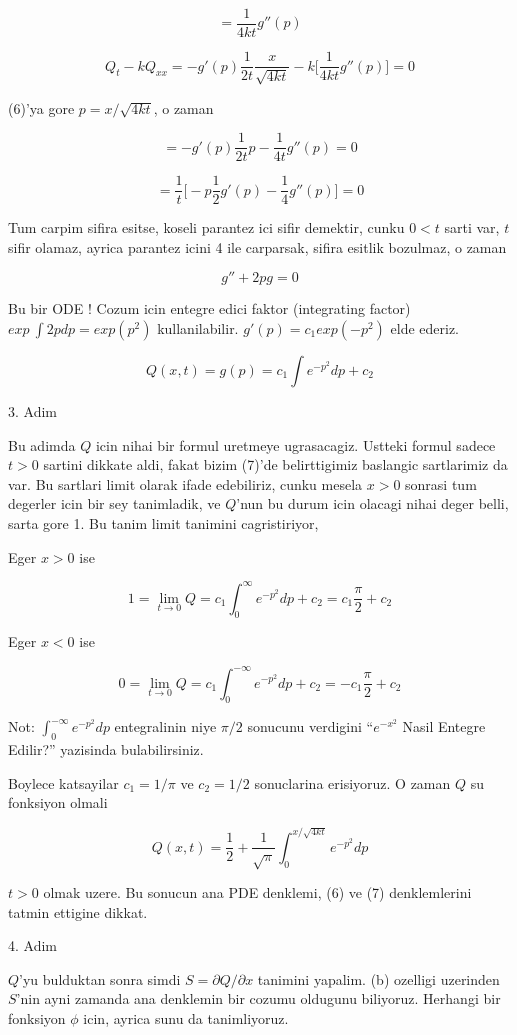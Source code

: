 \documentclass[12pt,fleqn]{article}\usepackage{../common}
\begin{document}
\[ = \frac{1}{4kt}g''(p) \]

\[ Q_t - kQ_{xx} = 
- g'(p)\frac{1}{2t} \frac{x}{\sqrt{4kt}} -
k\bigg[ 
 \frac{1}{4kt}g''(p) 
\bigg] = 0
 \]

(6)'ya gore $p = x/\sqrt{4kt}$, o zaman 

\[ =
- g'(p)\frac{1}{2t} p - \frac{1}{4t}g''(p)  = 0
 \]

\[ = \frac{1}{t} \bigg[
-p\frac{1}{2}g'(p) - \frac{1}{4}g''(p)
\bigg] = 0
 \]

Tum carpim sifira esitse, koseli parantez ici sifir demektir, cunku $0 < t$
sarti var, $t$ sifir olamaz, ayrica parantez icini 4 ile carparsak, sifira
esitlik bozulmaz, o zaman 

\[ g'' + 2pg = 0 \]

Bu bir ODE ! Cozum icin entegre edici faktor (integrating factor)
 $exp \
\int 2p dp = exp(p^2)$ kullanilabilir. $g'(p) = c_1 exp(-p^2)$ elde
ederiz. 

\[ Q(x,t) = g(p) = c_1 \int e^{-p^2} dp + c_2 \]

3. Adim 

Bu adimda $Q$ icin nihai bir formul uretmeye ugrasacagiz. Ustteki formul
sadece $t>0$ sartini dikkate aldi, fakat bizim (7)'de belirttigimiz
baslangic sartlarimiz da var. Bu sartlari limit olarak ifade edebiliriz,
cunku mesela $x>0$ sonrasi tum degerler icin bir sey tanimladik, ve $Q$'nun bu
durum icin olacagi nihai deger belli, sarta gore 1. Bu tanim limit tanimini
cagristiriyor, 

Eger $x>0$ ise

\[ 1 = \lim_{t \to 0} Q = 
 c_1 \int_0^{\infty} e^{-p^2} dp + c_2 = 
c_1 \frac{\pi}{2} + c_2
 \]


Eger $x<0$ ise

\[ 0 = \lim_{t \to 0} Q = 
 c_1 \int_0^{-\infty} e^{-p^2} dp + c_2 = 
-c_1 \frac{\pi}{2} + c_2
 \]

Not: $\int_0^{-\infty} e^{-p^2} dp$ entegralinin niye $\pi/2$ sonucunu
verdigini ``$e^{-x^2}$ Nasil Entegre Edilir?'' yazisinda bulabilirsiniz. 

Boylece katsayilar $c_1 = 1/\pi$ ve $c_2 = 1/2$ sonuclarina erisiyoruz. O
zaman $Q$ su fonksiyon olmali

\[ Q(x,t) = 
\frac{1}{2} + \frac{ 1}{\sqrt{\pi}} \int _{0}^{x/\sqrt{4kt}} e^{-p^2} dp
 \]

$t>0$ olmak uzere. Bu sonucun ana PDE denklemi, (6) ve (7) denklemlerini
tatmin ettigine dikkat. 

4. Adim

$Q$'yu bulduktan sonra simdi $S = \partial Q/\partial x$ tanimini
yapalim. (b) ozelligi uzerinden $S$'nin ayni zamanda ana denklemin bir
cozumu oldugunu biliyoruz. Herhangi bir fonksiyon $\phi$ icin, ayrica sunu
da tanimliyoruz. 
\end{document}
